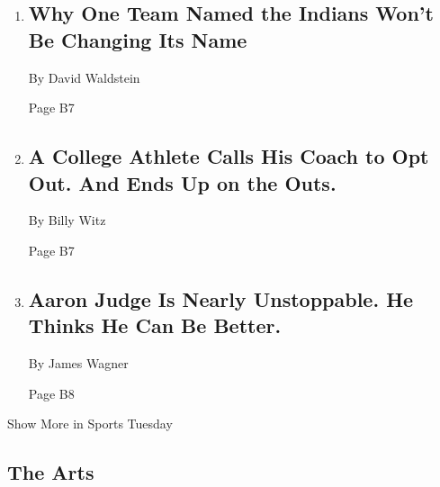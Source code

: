 \begin{enumerate}
\def\labelenumi{\arabic{enumi}.}
\item
  \href{/2020/08/03/sports/baseball/indians-team-names-mascots.html}{}

  \hypertarget{why-one-team-named-the-indians-wont-be-changing-its-name-1}{%
  \subsection{Why One Team Named the Indians Won't Be Changing Its
  Name}\label{why-one-team-named-the-indians-wont-be-changing-its-name-1}}

  By David Waldstein

  Page B7
\item
  \href{/2020/08/03/sports/coronavirus-college-athletes-opt-out.html}{}

  \hypertarget{a-college-athlete-calls-his-coach-to-opt-out-and-ends-up-on-the-outs-1}{%
  \subsection{A College Athlete Calls His Coach to Opt Out. And Ends Up
  on the
  Outs.}\label{a-college-athlete-calls-his-coach-to-opt-out-and-ends-up-on-the-outs-1}}

  By Billy Witz

  Page B7
\item
  \href{/2020/08/03/sports/baseball/aaron-judge-yankees.html}{}

  \hypertarget{aaron-judge-is-nearly-unstoppable-he-thinks-he-can-be-better}{%
  \subsection{Aaron Judge Is Nearly Unstoppable. He Thinks He Can Be
  Better.}\label{aaron-judge-is-nearly-unstoppable-he-thinks-he-can-be-better}}

  By James Wagner

  Page B8
\end{enumerate}

Show More in Sports Tuesday

\hypertarget{the-arts}{%
\subsection{The Arts}\label{the-arts}}

